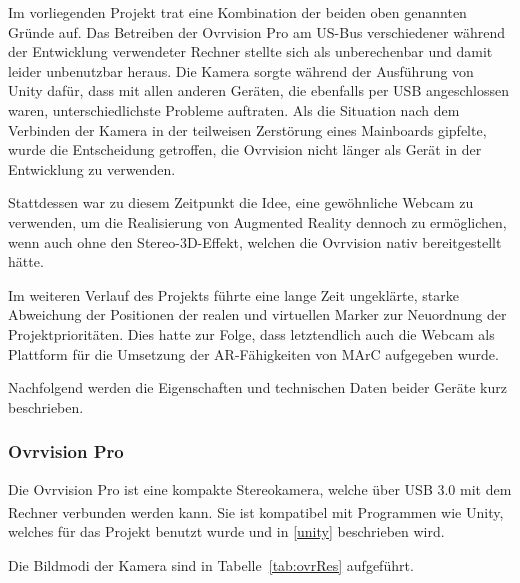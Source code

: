 Im vorliegenden Projekt trat eine Kombination der beiden oben genannten Gründe auf. Das Betreiben der Ovrvision Pro am US-Bus verschiedener während der Entwicklung verwendeter Rechner stellte sich als unberechenbar und damit leider unbenutzbar heraus. Die Kamera sorgte während der Ausführung von Unity dafür, dass mit allen anderen Geräten, die ebenfalls per USB angeschlossen waren, unterschiedlichste Probleme auftraten. Als die Situation nach dem Verbinden der Kamera in der teilweisen Zerstörung eines Mainboards gipfelte, wurde die Entscheidung getroffen, die Ovrvision nicht länger als Gerät in der Entwicklung zu verwenden.

Stattdessen war zu diesem Zeitpunkt die Idee, eine gewöhnliche Webcam zu verwenden, um die Realisierung von Augmented Reality dennoch zu ermöglichen, wenn auch ohne den Stereo-3D-Effekt, welchen die Ovrvision nativ bereitgestellt hätte.

Im weiteren Verlauf des Projekts führte eine lange Zeit ungeklärte, starke Abweichung der Positionen der realen und virtuellen Marker zur Neuordnung der Projektprioritäten. Dies hatte zur Folge, dass letztendlich auch die Webcam als Plattform für die Umsetzung der AR-Fähigkeiten von MArC aufgegeben wurde.

Nachfolgend werden die Eigenschaften und technischen Daten beider Geräte kurz beschrieben.
\subsubsection{Ovrvision Pro}\label{ovrvision}
Die Ovrvision Pro ist eine kompakte Stereokamera, welche über USB 3.0 mit dem Rechner verbunden werden kann\textsuperscript{\cite{website:ovrvision}}. Sie ist kompatibel mit Programmen wie Unity, welches für das Projekt benutzt wurde und in \ref{unity} beschrieben wird.

Die Bildmodi der Kamera sind in Tabelle~\ref{tab:ovrRes} aufgeführt.

